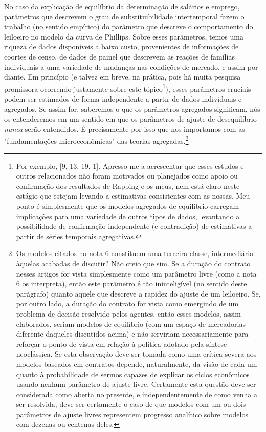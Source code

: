 \documentclass[12pt]{article}
\begin{document}
No caso da explicação de equilíbrio da determinação de salários e emprego, parâmetros que descrevem o grau de substituibilidade intertemporal fazem o trabalho (no sentido empírico) do parâmetro que descreve o comportamento do leiloeiro no modelo da curva de Phillips. Sobre esses parâmetros, temos uma riqueza de dados disponíveis a baixo custo, provenientes de informações de coortes de censo, de dados de painel que descrevem as reações de famílias individuais a uma variedade de mudanças nas condições de mercado, e assim por diante. Em princípio (e talvez em breve, na prática, pois há muita pesquisa promissora ocorrendo justamente sobre este tópico\footnote{Por exemplo, [9, 13, 19, 1]. Apresso-me a acrescentar que esses estudos e outros relacionados não foram motivados ou planejados como apoio ou confirmação dos resultados de Rapping e os meus, nem está claro neste estágio que estejam levando a estimativas consistentes com as nossas. Meu ponto é simplesmente que os modelos agregados de equilíbrio carregam implicações para uma variedade de outros tipos de dados, levantando a possibilidade de confirmação independente (e contradição) de estimativas a partir de séries temporais agregativas.}), esses parâmetros cruciais podem ser estimados de forma independente a partir de dados individuais e agregados. Se assim for, saberemos o que os parâmetros agregados significam, nós os entenderemos em um sentido em que os parâmetros de ajuste de desequilíbrio \textit{nunca} serão entendidos. É precisamente por isso que nos importamos com as "fundamentações microeconômicas" das teorias agregadas.\footnote{Os modelos citados na nota 6 constituem uma terceira classe, intermediária àquelas acabadas de discutir? Não creio que sim. Se a duração do contrato nesses artigos for vista simplesmente como um parâmetro livre (como a nota 6 os interpreta), então este parâmetro é tão ininteligível (no sentido deste parágrafo) quanto aquele que descreve a rapidez do ajuste de um leiloeiro. Se, por outro lado, a duração do contrato for vista como emergindo de um problema de decisão resolvido pelos agentes, então esses modelos, assim elaborados, seriam modelos de equilíbrio (com um espaço de mercadorias diferente daqueles discutidos acima) e não serviriam necessariamente para reforçar o ponto de vista em relação à política adotado pela síntese neoclássica. Se esta observação deve ser tomada como uma crítica severa aos modelos baseados em contratos depende, naturalmente, da visão de cada um quanto à probabilidade de sermos capazes de explicar os ciclos econômicos usando nenhum parâmetro de ajuste livre. Certamente esta questão deve ser considerada como aberta no presente, e independentemente de como venha a ser resolvida, deve ser certamente o caso de que modelos com um ou dois parâmetros de ajuste livres representem progresso analítico sobre modelos com dezenas ou centenas deles.}
\end{document}
